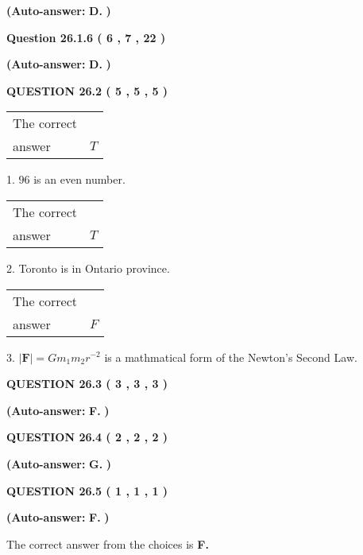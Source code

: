 \documentclass[12pt]{article}
\begin{document}
 
{\textbf{(Auto-answer:}}
{\textbf{\large{
D.}}}
{\textbf{)}}
 
 
  
  
{\textbf{\large{Question
26.1.6 
 (           6 ,           7 ,          22 )
}}}
 
 
{\textbf{(Auto-answer:}}
{\textbf{\large{
D.}}}
{\textbf{)}}
 
 
  
  
{\textbf{\large{QUESTION
26.2 
 (           5 ,           5 ,           5 )
}}}

 
\noindent\begin{tabular}{|l|l|}\hline The correct & \\
          answer &  %
$T$ \\ \hline \end{tabular}
1. $ %
96$ is an  %
even number.
 
\noindent\begin{tabular}{|l|l|}\hline The correct & \\
          answer &  %
$T$ \\ \hline \end{tabular}
2.  %
Toronto is in  %
Ontario province.
 
\noindent\begin{tabular}{|l|l|}\hline The correct & \\
          answer &  %
$F$ \\ \hline \end{tabular}
3.  %
$\left| \mathbf{F}\right| =Gm_1m_2r^{-2}$ is a mathmatical form of  %
the Newton's Second Law.
 
  
  
{\textbf{\large{QUESTION
26.3 
 (           3 ,           3 ,           3 )
}}}
 
 
{\textbf{(Auto-answer:}}
{\textbf{\large{
F.}}}
{\textbf{)}}
 
 
  
  
{\textbf{\large{QUESTION
26.4 
 (           2 ,           2 ,           2 )
}}}
 
 
{\textbf{(Auto-answer:}}
{\textbf{\large{
G.}}}
{\textbf{)}}
 
 
  
  
{\textbf{\large{QUESTION
26.5 
 (           1 ,           1 ,           1 )
}}}
 
 
{\textbf{(Auto-answer:}}
{\textbf{\large{
F.}}}
{\textbf{)}}
 
 

The correct answer from the choices is
{\textbf{\large{
F.}}}
 
\end{document}
